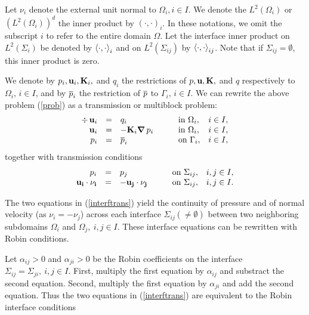 Let $\nu_i$ denote the external unit normal to $\Omega_i, i \in I$. We denote
the $L^2(\Omega_i)$ or $(L^2(\Omega_i))^d$ the inner product by $(\cdot,
\cdot)_{i}$. In these notations, we omit the subscript $i$ to refer to the
entire domain $\Omega$. Let the interface inner product on $L^2(\Sigma_i)$ be
denoted by $\left<\cdot, \cdot \right>_i$ and on $L^2(\Sigma_{ij})$ by $\left<
\cdot, \cdot \right>_{ij}$. Note that if $\Sigma_{ij}=\emptyset$, this inner
product is zero.

We denote by $p_i,{\bf u}_i,{\bf K}_i,$ and $q_i$ the restrictions of $p,{\bf
  u},{\bf K},$ and $q$ respectively to $\Omega_{i},\, i \in I$, and by
$\overline{p}_i$ the restriction of $\overline{p}$ to $\Gamma_i,\, i \in I$.  We can
rewrite the above problem (\ref{prob}) as a transmission or multiblock problem:
\begin{equation}\label{probt}\begin{array}{rllll}
\div \,{\bf u}_i &=& q_i &\qquad\mbox{in }\Omega_{i},&i \in I,\\
{\bf u}_i &=& -{\bf K}_i\mbox{\boldmath $\nabla$}\,p_i &\qquad\mbox{in }\Omega_{i},&i \in I,\\
p_i &=& \overline{p}_i &\qquad\mbox{on }\Gamma_{i},&i \in I,
\end{array}\end{equation}
together with transmission conditions
\begin{equation}\label{interftrans}\begin{array}{rllll}
p_i &=& p_j &\qquad\mbox{on }\Sigma_{ij},&i,j \in I,\\
{\bf u_i \cdot  \nu_i} &=& - {\bf u_j \cdot \nu_j}
          &\qquad\mbox{on }\Sigma_{ij},&i,j \in I.\\ 
\end{array}\end{equation}

The two equations in (\ref{interftrans}) yield the continuity of pressure and of normal 
velocity (as $\nu_i = -\nu_j$) across each interface $\Sigma_{ij} (\neq \emptyset)$ 
between two neighboring subdomains 
$\Omega_i$ and $\Omega_j, \ i,j \in I$. These interface equations can be rewritten 
with Robin conditions. 

Let $\alpha_{ij} > 0$ and $\alpha_{ji} > 0$ be the
Robin coefficients on the interface $\Sigma_{ij} = \Sigma_{ji} , \ i,j \in I$. 
First, multiply the first equation by $\alpha_{ij}$ and substract the second equation. 
Second, multiply the first equation by $\alpha_{ji}$ and add the second equation. 
Thus the two equations in (\ref{interftrans}) are equivalent to the Robin
interface conditions 

